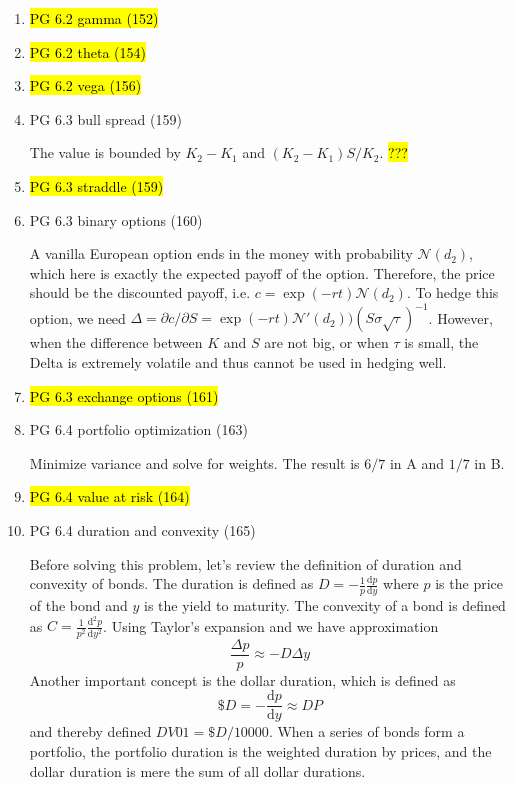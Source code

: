 \documentclass[11pt]{article}
\renewcommand{\d}{\text{d}}
\newenvironment{note}{\begin{enumerate}[leftmargin=1em,topsep=0pt,noitemsep]}{\end{enumerate}}
\newcommand{\solution}{\boxed{\textbf{SOLUTION}}\hspace{.5em}}
\begin{document}
\begin{spacing}{1.1}
\begin{note}
\textbf{C}. We need Delta hedging. This means with every $1$ option bought we also short $\Delta$ stocks.

\textbf{D}. Since it's at-the-money, we have $S=K$. Also, for small $r$ a typical volatility $\sigma< 40\%$ and maturity $\tau < 1/4$ year both tells that the value of the option is approximated by
$$
c = S\exp(-yt)\mathcal{N}(d_1) - K\exp(-rt)\mathcal{N}(d_2) \approx S(\mathcal{N}(d_1) - \mathcal{N}(d_2)) \approx \frac{\sigma\sqrt{\tau}S}{\sqrt{2\pi}} \approx 0.4\sigma S\sqrt{\tau}.
$$

\item \hl{PG 6.2 gamma (152)}

\item \hl{PG 6.2 theta (154)}

\item \hl{PG 6.2 vega (156)}

\item PG 6.3 bull spread (159)

\solution The value is bounded by $K_2 - K_1$ and $(K_2 - K_1) S / K_2$. \hl{???}

\item \hl{PG 6.3 straddle (159)}

\item PG 6.3 binary options (160)

\solution A vanilla European option ends in the money with probability $\mathcal{N}(d_2)$, which here is exactly the expected payoff of the option. Therefore, the price should be the discounted payoff, i.e. $c = \exp(-rt)\mathcal{N}(d_2)$. To hedge this option, we need $\Delta = \partial c / \partial S = \exp(-rt)\mathcal{N}'(d_2))(S\sigma\sqrt{\tau})^{-1}$. However, when the difference between $K$ and $S$ are not big, or when $\tau$ is small, the Delta is extremely volatile and thus cannot be used in hedging well.

\item \hl{PG 6.3 exchange options (161)}

\item PG 6.4 portfolio optimization (163)

\solution Minimize variance and solve for weights. The result is $6/7$ in A and $1/7$ in B.

\item \hl{PG 6.4 value at risk (164)}

\item PG 6.4 duration and convexity (165)

\solution Before solving this problem, let's review the definition of duration and convexity of bonds. The duration is defined as $D = -\frac{1}{p}\frac{\d p}{\d y}$ where $p$ is the price of the bond and $y$ is the yield to maturity. The convexity of a bond is defined as $C = \frac{1}{p^2}\frac{\d^2 p}{\d y^2}$. Using Taylor's expansion and we have approximation
$$
\frac{\Delta p}{p}\approx -D\Delta y
$$
Another important concept is the dollar duration, which is defined as
$$
\$D = -\frac{\d p}{\d y}\approx DP
$$
and thereby defined $DV01 = \$D / 10000$.
When a series of bonds form a portfolio, the portfolio duration is the weighted duration by prices, and the dollar duration is mere the sum of all dollar durations.


\end{note}
\end{spacing}
\end{document}
